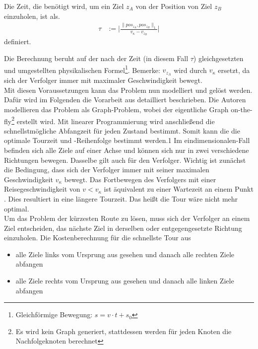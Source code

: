 \documentclass[german,version-2019-11]{uzl-thesis}
\begin{document}
\begin{definition}
\label{def:WegZeit}
Die Zeit, die benötigt wird, um ein Ziel $z_A$ von der Position von Ziel $z_B$ einzuholen, ist als. 
\begin{align*}
\tau &:= \bigg\vert\frac{\|pos_{z_A},pos_{z_B}\|_1}{v_{\kappa}-v_{z_B}}\bigg\vert
\end{align*} 
definiert.
\end{definition}\noindent
Die Berechnung beruht auf der nach der Zeit (in diesem Fall $\tau$) gleichgesetzten und umgestellten physikalischen Formel\footnote{Gleichförmige Bewegung: $s=v\cdot t+s_0$}.
Bemerke: $v_{z_A}$ wird durch $v_{\kappa}$ ersetzt, da sich der Verfolger immer mit maximaler Geschwindigkeit bewegt.\\
Mit diesen Voraussetzungen kann das Problem nun modelliert und gelöst werden. Dafür wird im Folgenden die Vorarbeit aus \cite{helvig} detailliert beschrieben. Die Autoren modellieren das Problem als Graph-Problem, wobei der eigentliche Graph on-the-fly\footnote{Es wird kein Graph generiert, stattdessen werden für jeden Knoten die Nachfolgeknoten berechnet} erstellt wird. Mit linearer Programmierung wird anschließend die schnellstmögliche Abfangzeit für jeden Zustand bestimmt. Somit kann die die optimale Tourzeit und -Reihenfolge bestimmt werden.1
Im eindimensionalen-Fall befinden sich alle Ziele auf einer Achse und können sich nur in zwei verschiedene Richtungen bewegen. Dasselbe gilt auch für den Verfolger. Wichtig ist zunächst die Bedingung, dass sich der Verfolger immer mit seiner maximalen Geschwindigkeit $v_{\kappa}$ bewegt. Das Fortbewegen des Verfolgers mit einer Reisegeschwindigkeit von $v<v_{\kappa}$ ist äquivalent zu einer Wartezeit an einem Punkt  \cite{helvig}. Dies resultiert in eine längere Tourzeit. Das heißt die Tour wäre nicht mehr optimal.\\
Um das Problem der kürzesten Route zu lösen, muss sich der Verfolger an einem Ziel entscheiden, das nächste Ziel in derselben oder entgegengesetzte Richtung einzuholen. Die Kostenberechnung für die schnellste Tour aus
\begin{itemize}
\item alle Ziele links vom Ursprung aus gesehen und danach alle rechten Ziele abfangen
\item alle Ziele rechts vom Ursprung aus gesehen und danach alle linken Ziele abfangen
\end{itemize} 
\end{document}
